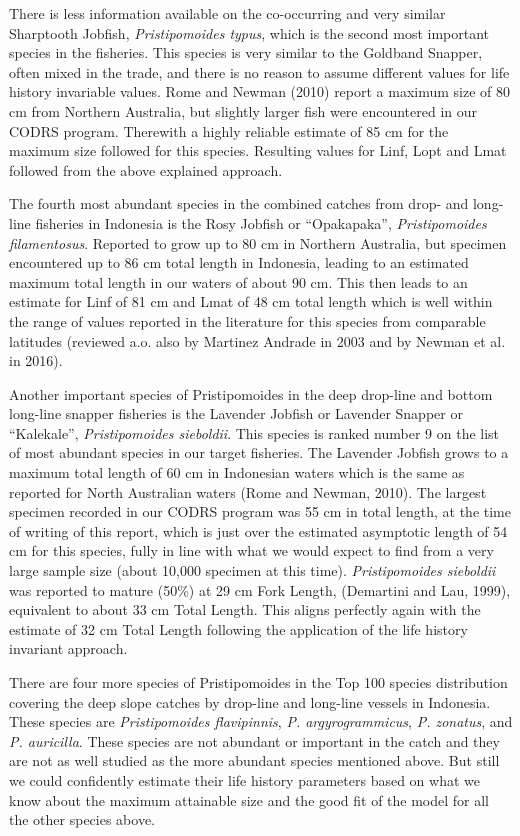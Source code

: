 There is less information available on the co-occurring and very similar Sharptooth Jobfish, \textit{Pristipomoides typus}, which is the second most important species in the fisheries. This species is very similar to the Goldband Snapper, often mixed in the trade, and there is no reason to assume different values for life history invariable values. Rome and Newman (2010) report a maximum size of 80 cm from Northern Australia, but slightly larger fish were encountered in our CODRS program. Therewith a highly reliable estimate of 85 cm for the maximum size followed for this species. Resulting values for Linf, Lopt and Lmat followed from the above explained approach.

The fourth most abundant species in the combined catches from drop- and long-line fisheries in Indonesia is the Rosy Jobfish or ``Opakapaka'', \textit{Pristipomoides filamentosus}. Reported to grow up to 80 cm in Northern Australia, but specimen encountered up to 86 cm total length in Indonesia, leading to an estimated maximum total length in our waters of about 90 cm. This then leads to an estimate for Linf of 81 cm and Lmat of 48 cm total length which is well within the range of values reported in the literature for this species from comparable latitudes (reviewed a.o. also by Martinez Andrade in 2003 and by Newman et al. in 2016).

Another important species of Pristipomoides in the deep drop-line and bottom long-line snapper fisheries is the Lavender Jobfish or Lavender Snapper or ``Kalekale'', \textit{Pristipomoides sieboldii}. This species is ranked number 9 on the list of most abundant species in our target fisheries. The Lavender Jobfish grows to a maximum total length of 60 cm in Indonesian waters which is the same as reported for North Australian waters (Rome and Newman, 2010). The largest specimen recorded in our CODRS program was 55 cm in total length, at the time of writing of this report, which is just over the estimated asymptotic length of 54 cm for this species, fully in line with what we would expect to find from a very large sample size (about 10,000 specimen at this time). \textit{Pristipomoides sieboldii} was reported to mature (50\%) at 29 cm Fork Length, (Demartini and Lau, 1999), equivalent to about 33 cm Total Length. This aligns perfectly again with the estimate of 32 cm Total Length following the application of the life history invariant approach.

There are four more species of Pristipomoides in the Top 100 species distribution covering the deep slope catches by drop-line and long-line vessels in Indonesia. These species are \textit{Pristipomoides flavipinnis}, \textit{P. argyrogrammicus}, \textit{P. zonatus},  and \textit{P. auricilla}. These species are not abundant or important in the catch and they are not as well studied as the more abundant species mentioned above. But still we could confidently estimate their life history parameters based on what we know about the maximum attainable size and the good fit of the model for all the other species above.

